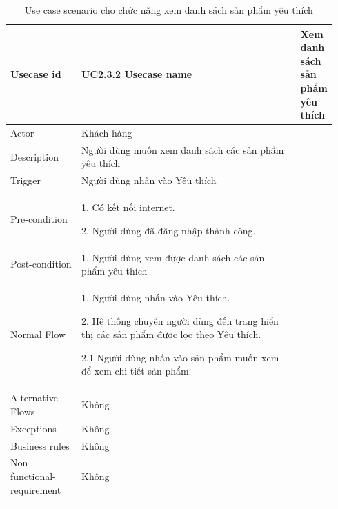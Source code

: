 \begin{longtable}{|>{\hspace{0pt}}m{0.229\linewidth}|>{\hspace{0pt}}m{0.713\linewidth}|} 
\hline
Usecase id & UC2.3.2 \endfirsthead 
\hline
Usecase name & Xem danh sách sản phẩm yêu thích \\ 
\hline
Actor & Khách hàng \\ 
\hline
Description & Người dùng muốn xem danh sách các sản phẩm yêu thích \\ 
\hline
Trigger & Người dùng nhấn vào Yêu thích \\ 
\hline
Pre-condition & 1. Có kết nối internet.\par{}2. Người dùng đã đăng nhập thành công. \\ 
\hline
Post-condition & 1. Người dùng xem được danh sách các sản phẩm yêu thích \\ 
\hline
Normal Flow & 1. Người dùng nhấn vào Yêu thích.\par{}2. Hệ thống chuyển người dùng đến trang hiển thị các sản phẩm được lọc theo Yêu thích.\par{}2.1 Người dùng nhấn vào sản phẩm muốn xem để xem chi tiết sản phẩm. \\ 
\hline
Alternative Flows & Không~ \\ 
\hline
Exceptions & Không \\ 
\hline
Business rules & Không \\ 
\hline
Non functional-requirement & Không \\ 
\hline
\caption{Use case scenario cho chức năng xem danh sách sản phẩm yêu thích}

\end{longtable}


